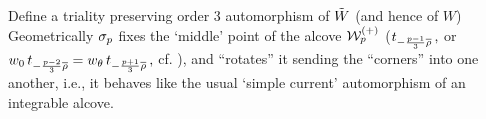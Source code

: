 Define a triality
preserving  order 3 automorphism of $\tilde W$ (and hence of $W$)
%
\eqn{}
%
Geometrically $\sigma_p$ fixes the `middle' point of the alcove
${\cal W}^{(+)}_p$ ($t_{-{p-1\over 3}\overline{\rho}}\,,$ or $w_0\,t_{-{p-2\over
3}\overline{\rho}}=w_{\theta}\, t_{-{p+1\over 3}\overline{\rho}}\,,$ cf. \alca{}), and
``rotates'' it sending the ``corners'' into one another, i.e., it
behaves like the usual `simple current' automorphism of an
integrable alcove. 

%
%



